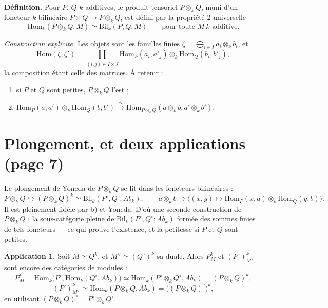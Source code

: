 \documentclass[11pt,a4paper]{article}
\begin{document}
\textbf{Définition.} Pour $P$, $Q$ $k$-additives, le produit tensoriel
$P \otimes_{k} Q$, muni d'un foncteur $k$-bilinéaire $P \times Q \to P \otimes_{k}
Q$, est défini par la propriété 2-universelle
\[
\mathrm{Hom}_{k}(P \otimes_{k} Q, M) \simeq \mathrm{Bil}_{k}(P, Q; M)
\qquad \text{pour toute } M \ k\text{-additive}.
\]

\emph{Construction explicite.} Les objets sont les familles finies
$\zeta = \bigoplus_{i \in I} a_{i} \otimes_{k} b_{i}$, et
\[
\mathrm{Hom}(\zeta, \zeta') = \prod_{(i,j) \in I \times J}
\mathrm{Hom}_{P}(a_{i}, a'_{j}) \otimes_{k} \mathrm{Hom}_{Q}(b_{i}, b'_{j}),
\]
la composition étant celle des matrices. À retenir :
\begin{enumerate}
\item[a)] si $P$ et $Q$ sont petites, $P \otimes_{k} Q$ l'est ;
\item[b)] $\mathrm{Hom}_{P} (a, a') \otimes_{k} \mathrm{Hom}_{Q}(b, b')
\xrightarrow{\;\sim\;} \mathrm{Hom}_{P \otimes_{k} Q}(a \otimes_{k} b, a'
\otimes_{k} b')$.
\end{enumerate}

\section*{Plongement, et deux applications (page 7)}

Le plongement de Yoneda de $P \otimes_{k} Q$ se lit dans les foncteurs
bilinéaires :
\[
P \otimes_{k} Q \hookrightarrow (P \otimes_{k} Q)^{k} \simeq
\mathrm{Bil}_{k}(P^{\circ}, Q^{\circ}; Ab_{k}),
\qquad
a \otimes_{k} b \longmapsto \bigl((x, y) \mapsto \mathrm{Hom}_{P}(x, a)
\otimes_{k} \mathrm{Hom}_{Q}(y, b)\bigr).
\]
Il est pleinement fidèle par b) et Yoneda. D'où une seconde construction de
$P \otimes_{k} Q$ : la sous-catégorie pleine de
$\mathrm{Bil}_{k}(P^{\circ}, Q^{\circ}; Ab_{k})$ formée des sommes finies de tels
foncteurs --- ce qui prouve l'existence, et la petitesse si $P$ et $Q$ sont
petites.

\textbf{Application 1.} Soit $M \simeq Q^{k}$, et $M^{\vee} \simeq
(Q^{\circ})^{k}$ sa duale. Alors $P^{k}_{M}$ et $(P^{\circ})^{k}_{M^{\vee}}$ sont
encore des catégories de modules :
\[
P^{k}_{M} = \mathrm{Hom}_{k}\bigl(P^{\circ}, \mathrm{Hom}_{k}(Q^{\circ},
Ab_{k})\bigr) \simeq \mathrm{Hom}_{k}(P^{\circ} \otimes_{k} Q^{\circ}, Ab_{k}) =
(P \otimes_{k} Q)^{k},
\]
\[
(P^{\circ})^{k}_{M^{\vee}} \simeq \mathrm{Hom}_{k}(P \otimes_{k} Q, Ab_{k}) =
\bigl((P \otimes_{k} Q)^{\circ}\bigr)^{k},
\]
en utilisant $(P \otimes_{k} Q)^{\circ} = P^{\circ} \otimes_{k} Q^{\circ}$.
\end{document}
